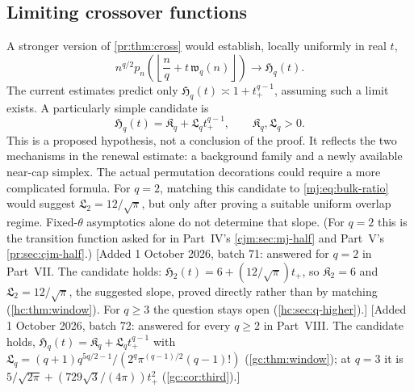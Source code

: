 \documentclass[11pt,a4paper]{article}
\theoremstyle{definition}\newaliascnt{definition}{theorem}
\theoremstyle{remark}\newaliascnt{remark}{theorem}
\begin{document}
\subsection{Limiting crossover functions}
\label{pr:sec:q-crossover}
A stronger version of \cref{pr:thm:cross} would establish, locally uniformly
in real $t$,
\begin{equation}
 n^{q/2}p_n\!\left(\left\lfloor\frac nq+t\,\mathfrak w_q(n)\right\rfloor\right)
 \longrightarrow \mathfrak H_q(t).
 \label{pr:eq:Hquestion}
\end{equation}
The current estimates predict only $\mathfrak H_q(t)\asymp1+t_+^{q-1}$,
assuming such a limit exists. A particularly simple candidate is
\[
 \mathfrak H_q(t)=\mathfrak K_q+\mathfrak L_q t_+^{q-1},\qquad
 \mathfrak K_q,\mathfrak L_q>0.
\]
This is a proposed hypothesis, not a conclusion of the proof. It reflects
the two mechanisms in the renewal estimate: a background family and a newly
available near-cap simplex. The actual permutation decorations could require
a more complicated formula. For $q=2$, matching this candidate to
\eqref{mj:eq:bulk-ratio} would suggest $\mathfrak L_2=12/\sqrt\pi$, but only
after proving a suitable uniform overlap regime. Fixed-$\theta$ asymptotics
alone do not determine that slope. (For $q=2$ this is the transition
function asked for in Part~IV's \cref{cjm:sec:mj-half} and Part~V's
\cref{pr:sec:cjm-half}.)
[Added 1 October 2026, batch 71: answered for $q=2$ in Part~VII. The
candidate holds: $\mathfrak H_2(t)=6+(12/\sqrt\pi)t_+$, so
$\mathfrak K_2=6$ and $\mathfrak L_2=12/\sqrt\pi$, the suggested slope,
proved directly rather than by matching (\cref{hc:thm:window}). For $q\ge3$
the question stays open (\cref{hc:sec:q-higher}).]
[Added 1 October 2026, batch 72: answered for every $q\ge2$ in Part~VIII.
The candidate holds, $\mathfrak H_q(t)=\mathfrak K_q+\mathfrak L_qt_+^{q-1}$
with $\mathfrak L_q=(q+1)q^{5q/2-1}/(2^q\pi^{(q-1)/2}(q-1)!)$
(\cref{gc:thm:window}); at $q=3$ it is
$5/\sqrt{2\pi}+(729\sqrt3/(4\pi))t_+^2$ (\cref{gc:cor:third}).]
\end{document}
